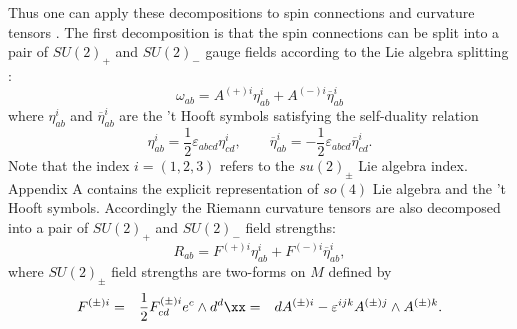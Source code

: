 \documentclass[12pt,epsf]{article}
\begin{document}
Thus one can apply these decompositions to spin connections and curvature tensors \cite{oh-yang,joy-jhep,opy-jhep}.
The first decomposition is that the spin connections can be split into a pair of $SU(2)_+$
and $SU(2)_-$ gauge fields according to the Lie algebra splitting :
\begin{equation}\label{ga-split}
\omega_{ab} = A^{(+)i} \eta^i_{ab}  +  A^{(-)i}\overline{\eta}^i_{ab}
\end{equation}
where $ \eta^i_{ab}$ and $\overline{\eta}^i_{ab}$ are the 't Hooft symbols satisfying the self-duality relation
\begin{equation}\label{eta-duality}
  \eta^i_{ab} = \frac{1}{2} \varepsilon_{abcd} \eta^i_{cd},
  \qquad  \overline{\eta}^i_{ab} = - \frac{1}{2} \varepsilon_{abcd} \overline{\eta}^i_{cd}.
\end{equation}
Note that the index $i=(1,2,3)$ refers to the $su(2)_\pm$ Lie algebra index.
Appendix A contains the explicit representation of $so(4)$ Lie algebra and the 't Hooft symbols.
Accordingly the Riemann curvature tensors are also decomposed into a pair of $SU(2)_+$
and $SU(2)_-$ field strengths:
\begin{equation}\label{gf-split}
R_{ab} = F^{(+)i} \eta^i_{ab}  +  F^{(-)i}\overline{\eta}^i_{ab},
\end{equation}
where $SU(2)_\pm$ field strengths are two-forms on $M$ defined by
\begin{eqnarray}\label{2f-form}
   F^{(\pm)i} &=& \frac{1}{2}  F^{(\pm)i}_{cd} e^c \wedge d^d \xx
   &=& dA^{(\pm)i} - \varepsilon^{ijk} A^{(\pm)j} \wedge A^{(\pm)k}.
\end{eqnarray}
\end{document}
